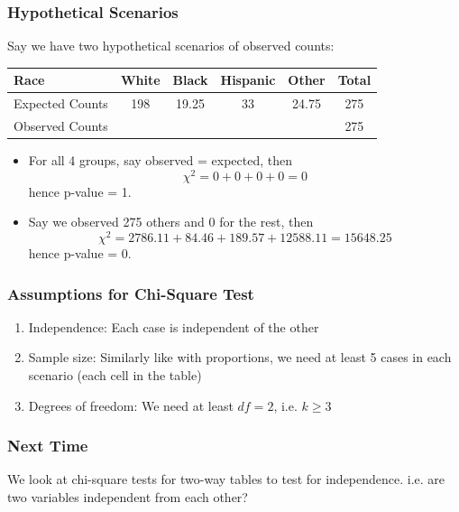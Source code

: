 \documentclass[handout]{beamer}
\newcommand{\blue}[1]{\textcolor{blue2}{#1}}
\begin{document}
\begin{frame}[fragile]
\frametitle{Hypothetical Scenarios}
Say we have two hypothetical scenarios of observed counts:
\begin{center}
\begin{tabular}{l||cccc|c}
Race & White & Black & Hispanic & Other & Total \\ 
\hline
Expected Counts & 198 & 19.25 & 33 & 24.75 & 275\\ 
Observed Counts &  &  &  &  & 275 \\ 
\end{tabular}
\end{center}

%
%
\begin{itemize}
\item For all 4 groups, say observed = expected, then
\[
\chi^2 = 0 + 0 + 0 + 0 = 0
\]
hence p-value = 1.
\pause\item Say we observed 275 others and 0 for the rest, then 
\[
\chi^2 = 2786.11 + 84.46 + 189.57 + 12588.11 = 15648.25
\]
hence p-value = 0.
\end{itemize}

\end{frame}


\begin{frame}[fragile]
\frametitle{Assumptions for Chi-Square Test}
%
%
\begin{enumerate}
\item \blue{Independence}:  Each case is independent of the other
\pause\item \blue{Sample size}:  Similarly like with proportions, we need at least 5 cases in each scenario (each cell in the table)
\pause\item \blue{Degrees of freedom}:  We need at least $df=2$, i.e. $k\geq 3$
\end{enumerate}
\end{frame}


\begin{frame}[fragile]
\frametitle{Next Time}
We look at \blue{chi-square tests for two-way tables} to test for \blue{independence}.  i.e. are two variables independent from each other?

\end{frame}
\end{document}
